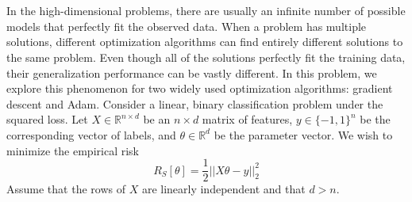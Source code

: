 \documentclass[a4paper]{article}
\begin{document}
\section{}
In the high-dimensional problems, there are usually an infinite number of possible models that perfectly fit the observed data.
When a problem has multiple solutions, different optimization algorithms can find entirely different solutions to the same problem.
Even though all of the solutions perfectly fit the training data, their generalization performance can be vastly different.
In this problem, we explore this phenomenon for two widely used optimization algorithms: gradient descent and Adam.
Consider a linear, binary classification problem under the squared loss.
Let $X \in \mathbb{R}^{n\times d}$ be an $n \times d$ matrix of features, $y \in \{-1, 1\}^n$ be the corresponding vector of labels, and $\theta \in \mathbb{R}^d$ be the parameter vector.
We wish to minimize the empirical risk
\begin{equation}\label{eq}
R_S[\theta] = \frac{1}{2} ||X\theta-y||^2_2
\end{equation}
Assume that the rows of $X$ are linearly independent and that $d > n$.
\end{document}
